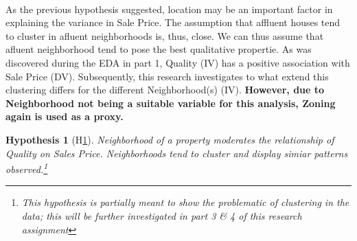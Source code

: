 \documentclass{article}
\newtheorem{hyp}{Hypothesis}
\begin{document}
\begin{center}
\end{center}


\indent \paragraph{} As the previous hypothesis suggested, location may be an important factor in explaining the variance in Sale Price. The assumption that affluent houses tend to cluster in afluent neighborhoods is, thus, close. We can thus assume that afluent neighborhood tend to pose the best qualitative propertie. As was discovered during the EDA in part 1, Quality (IV) has a positive association with Sale Price (DV). Subsequently, this research investigates to what extend this clustering differs for the different Neighborhood(s) (IV). \textbf{However, due to Neighborhood not being a suitable variable for this analysis, Zoning again is used as a proxy.}

\begin{hyp}[H\ref{hyp:third}] \label{hyp:third}
Neighborhood of a property moderates the relationship of Quality on Sales Price. Neighborhoods tend to cluster and display simiar patterns observed.\footnote{This hypothesis is partially meant to show the problematic of clustering in the data; this will be further investigated in part 3 \& 4 of this research assignment}


\end{hyp}

\begin{center}
\end{center}
\end{document}
